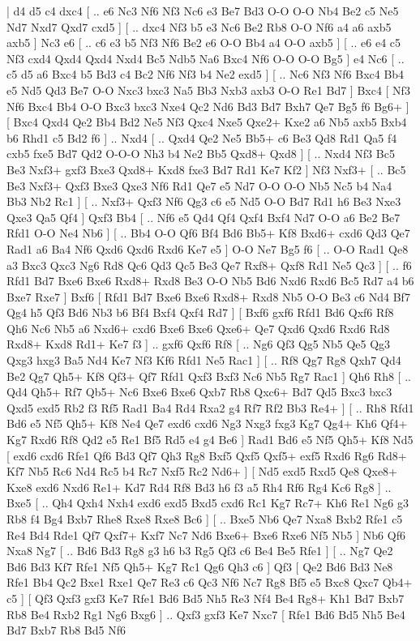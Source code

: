 \makegametitle 
|   d4   d5    c4   dxc4 [ .. e6  Nc3 Nf6  Nf3 Nc6  e3 Be7  Bd3 O-O  O-O Nb4  Be2 c5  Ne5 Nd7  Nxd7 Qxd7  cxd5   ]  [ .. dxc4  Nf3 b5  e3 Nc6  Be2 Rb8  O-O Nf6  a4 a6  axb5 axb5   ]  Nc3   e6 [ .. c6  e3 b5  Nf3 Nf6  Be2 e6  O-O Bb4  a4 O-O  axb5   ]  [ .. e6  e4 c5  Nf3 cxd4  Qxd4 Qxd4  Nxd4 Bc5  Ndb5 Na6  Bxc4 Nf6  O-O O-O  Bg5   ]  e4   Nc6 [ .. c5  d5 a6  Bxc4 b5  Bd3 c4  Bc2 Nf6  Nf3 b4  Ne2 exd5   ]  [ .. Nc6  Nf3 Nf6  Bxc4 Bb4  e5 Nd5  Qd3 Be7  O-O Nxc3  bxc3 Na5  Bb3 Nxb3  axb3 O-O  Re1 Bd7   ]  Bxc4 [  Nf3 Nf6  Bxc4 Bb4  O-O Bxc3  bxc3 Nxe4  Qc2 Nd6  Bd3 Bd7  Bxh7 Qe7  Bg5 f6  Bg6+   ]  [  Bxc4 Qxd4  Qe2 Bb4  Bd2 Ne5  Nf3 Qxc4  Nxe5 Qxe2+  Kxe2 a6  Nb5 axb5  Bxb4 b6  Rhd1 c5  Bd2 f6   ] .. Nxd4 [ .. Qxd4  Qe2 Ne5  Bb5+ c6  Be3 Qd8  Rd1 Qa5  f4 cxb5  fxe5 Bd7  Qd2 O-O-O  Nh3 b4  Ne2 Bb5  Qxd8+ Qxd8   ]  [ .. Nxd4  Nf3 Bc5  Be3 Nxf3+  gxf3 Bxe3  Qxd8+ Kxd8  fxe3 Bd7  Rd1 Ke7  Kf2   ]  Nf3   Nxf3+ [ .. Bc5  Be3 Nxf3+  Qxf3 Bxe3  Qxe3 Nf6  Rd1 Qe7  e5 Nd7  O-O O-O  Nb5 Nc5  b4 Na4  Bb3 Nb2  Rc1   ]  [ .. Nxf3+  Qxf3 Nf6  Qg3 c6  e5 Nd5  O-O Bd7  Rd1 h6  Be3 Nxe3  Qxe3 Qa5  Qf4   ]  Qxf3   Bb4 [ .. Nf6  e5 Qd4  Qf4 Qxf4  Bxf4 Nd7  O-O a6  Be2 Be7  Rfd1 O-O  Ne4 Nb6   ]  [ .. Bb4  O-O Qf6  Bf4 Bd6  Bb5+ Kf8  Bxd6+ cxd6  Qd3 Qe7  Rad1 a6  Ba4 Nf6  Qxd6 Qxd6  Rxd6 Ke7  e5   ]  O-O   Ne7    Bg5   f6 [ .. O-O  Rad1 Qe8  a3 Bxc3  Qxc3 Ng6  Rd8 Qc6  Qd3 Qc5  Be3 Qe7  Rxf8+ Qxf8  Rd1 Ne5  Qc3   ]  [ .. f6  Rfd1 Bd7  Bxe6 Bxe6  Rxd8+ Rxd8  Be3 O-O  Nb5 Bd6  Nxd6 Rxd6  Bc5 Rd7  a4 b6  Bxe7 Rxe7   ]  Bxf6 [  Rfd1 Bd7  Bxe6 Bxe6  Rxd8+ Rxd8  Nb5 O-O  Be3 c6  Nd4 Bf7  Qg4 h5  Qf3 Bd6  Nb3 b6  Bf4 Bxf4  Qxf4 Rd7   ]  [  Bxf6 gxf6  Rfd1 Bd6  Qxf6 Rf8  Qh6 Nc6  Nb5 a6  Nxd6+ cxd6  Bxe6 Bxe6  Qxe6+ Qe7  Qxd6 Qxd6  Rxd6 Rd8  Rxd8+ Kxd8  Rd1+ Ke7  f3   ] .. gxf6    Qxf6   Rf8 [ .. Ng6  Qf3 Qg5  Nb5 Qe5  Qg3 Qxg3  hxg3 Ba5  Nd4 Ke7  Nf3 Kf6  Rfd1 Ne5  Rac1   ]  [ .. Rf8  Qg7 Rg8  Qxh7 Qd4  Be2 Qg7  Qh5+ Kf8  Qf3+ Qf7  Rfd1 Qxf3  Bxf3 Nc6  Nb5 Rg7  Rac1   ]  Qh6   Rh8 [ .. Qd4  Qh5+ Rf7  Qb5+ Nc6  Bxe6 Bxe6  Qxb7 Rb8  Qxc6+ Bd7  Qd5 Bxc3  bxc3 Qxd5  exd5 Rb2  f3 Rf5  Rad1 Ba4  Rd4 Rxa2  g4 Rf7  Rf2 Bb3  Re4+   ]  [ .. Rh8  Rfd1 Bd6  e5 Nf5  Qh5+ Kf8  Ne4 Qe7  exd6 cxd6  Ng3 Nxg3  fxg3 Kg7  Qg4+ Kh6  Qf4+ Kg7  Rxd6 Rf8  Qd2 e5  Re1 Bf5  Rd5 e4  g4 Be6   ]  Rad1   Bd6    e5   Nf5    Qh5+   Kf8    Nd5 [  exd6 cxd6  Rfe1 Qf6  Bd3 Qf7  Qh3 Rg8  Bxf5 Qxf5  Qxf5+ exf5  Rxd6 Rg6  Rd8+ Kf7  Nb5 Rc6  Nd4 Rc5  b4 Rc7  Nxf5 Rc2  Nd6+   ]  [  Nd5 exd5  Rxd5 Qe8  Qxe8+ Kxe8  exd6 Nxd6  Re1+ Kd7  Rd4 Rf8  Bd3 h6  f3 a5  Rh4 Rf6  Rg4 Kc6  Rg8   ] .. Bxe5 [ .. Qh4  Qxh4 Nxh4  exd6 exd5  Bxd5 cxd6  Rc1 Kg7  Rc7+ Kh6  Re1 Ng6  g3 Rb8  f4 Bg4  Bxb7 Rhe8  Rxe8 Rxe8  Bc6   ]  [ .. Bxe5  Nb6 Qe7  Nxa8 Bxb2  Rfe1 c5  Re4 Bd4  Rde1 Qf7  Qxf7+ Kxf7  Nc7 Nd6  Bxe6+ Bxe6  Rxe6 Nf5  Nb5   ]  Nb6   Qf6    Nxa8   Ng7 [ .. Bd6  Bd3 Rg8  g3 h6  b3 Rg5  Qf3 c6  Be4 Be5  Rfe1   ]  [ .. Ng7  Qe2 Bd6  Bd3 Kf7  Rfe1 Nf5  Qh5+ Kg7  Rc1 Qg6  Qh3 c6   ]  Qf3 [  Qe2 Bd6  Bd3 Ne8  Rfe1 Bb4  Qc2 Bxe1  Rxe1 Qe7  Re3 c6  Qc3 Nf6  Nc7 Rg8  Bf5 e5  Bxc8 Qxc7  Qb4+ c5   ]  [  Qf3 Qxf3  gxf3 Ke7  Rfe1 Bd6  Bd5 Nh5  Re3 Nf4  Be4 Rg8+  Kh1 Bd7  Bxb7 Rb8  Be4 Rxb2  Rg1 Ng6  Bxg6   ] .. Qxf3    gxf3   Ke7    Nxc7 [  Rfe1 Bd6  Bd5 Nh5  Be4 Bd7  Bxb7 Rb8  Bd5 Nf6 